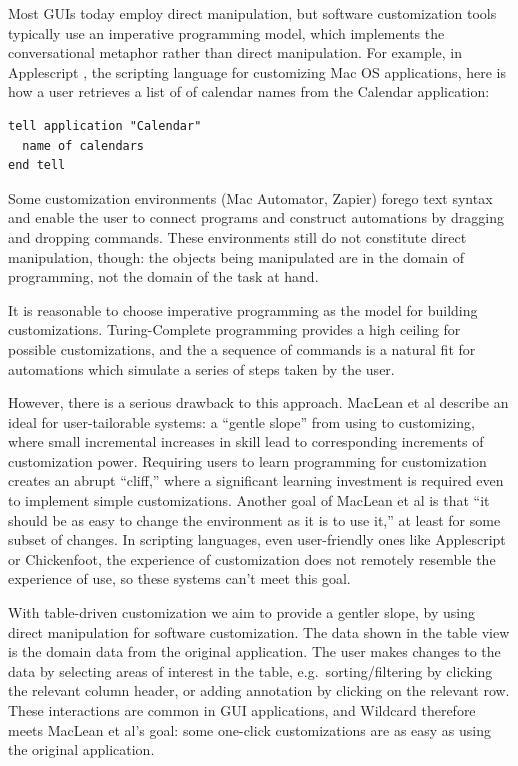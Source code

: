 \documentclass[sigplan,10pt,anonymous,review]{acmart}
\begin{document}
Most GUIs today employ direct manipulation, but software customization
tools typically use an imperative programming model, which implements
the conversational metaphor rather than direct manipulation. For
example, in Applescript \citep{cook2007}, the scripting language for
customizing Mac OS applications, here is how a user retrieves a list of
of calendar names from the Calendar application:

\begin{verbatim}
tell application "Calendar"
  name of calendars
end tell
\end{verbatim}

Some customization environments (Mac Automator, Zapier) forego text
syntax and enable the user to connect programs and construct automations
by dragging and dropping commands. These environments still do not
constitute direct manipulation, though: the objects being manipulated
are in the domain of programming, not the domain of the task at hand.

It is reasonable to choose imperative programming as the model for
building customizations. Turing-Complete programming provides a high
ceiling for possible customizations, and the a sequence of commands is a
natural fit for automations which simulate a series of steps taken by
the user.

However, there is a serious drawback to this approach. MacLean et al
\citep{maclean1990} describe an ideal for user-tailorable systems: a
``gentle slope'' from using to customizing, where small incremental
increases in skill lead to corresponding increments of customization
power. Requiring users to learn programming for customization creates an
abrupt ``cliff,'' where a significant learning investment is required
even to implement simple customizations. Another goal of MacLean et al
is that ``it should be as easy to change the environment as it is to use
it,'' at least for some subset of changes. In scripting languages, even
user-friendly ones like Applescript or Chickenfoot, the experience of
customization does not remotely resemble the experience of use, so these
systems can't meet this goal.

With table-driven customization we aim to provide a gentler slope, by
using direct manipulation for software customization. The data shown in
the table view is the domain data from the original application. The
user makes changes to the data by selecting areas of interest in the
table, e.g.~sorting/filtering by clicking the relevant column header, or
adding annotation by clicking on the relevant row. These interactions
are common in GUI applications, and Wildcard therefore meets MacLean et
al's goal: some one-click customizations are as easy as using the
original application.
\end{document}
